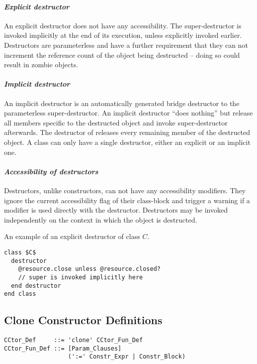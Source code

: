 \paragraph{\em Explicit destructor}
An explicit destructor does not have any accessibility. The super-destructor is invoked implicitly at the end of its execution, unless explicitly invoked earlier. Destructors are parameterless and have a further requirement that they can not increment the reference count of the object being destructed -- doing so could result in zombie objects. 

\paragraph{\em Implicit destructor}
An implicit destructor is an automatically generated bridge destructor to the parameterless super-destructor. An implicit destructor ``does nothing'' but release all members specific to the destructed object and invoke super-destructor afterwards. The destructor of  releases every remaining member of the destructed object. A class can only have a single destructor, either an explicit or an implicit one. 

\paragraph{\em Accessibility of destructors}
Destructors, unlike constructors, can not have any accessibility modifiers. They ignore the current accessibility flag of their class-block and trigger a warning if a modifier is used directly with the destructor. Destructors may be invoked independently on the context in which the object is destructed. 

\example An example of an explicit destructor of class $C$. 
\begin{lstlisting}
class $C$
  destructor
    @resource.close unless @resource.closed?
    // super is invoked implicitly here
  end destructor
end class
\end{lstlisting}






\subsection{Clone Constructor Definitions}
\label{sec:clone-def}

\syntax\begin{lstlisting}
CCtor_Def     ::= 'clone' CCtor_Fun_Def
CCtor_Fun_Def ::= [Param_Clauses] 
                  (':=' Constr_Expr | Constr_Block)
\end{lstlisting}

